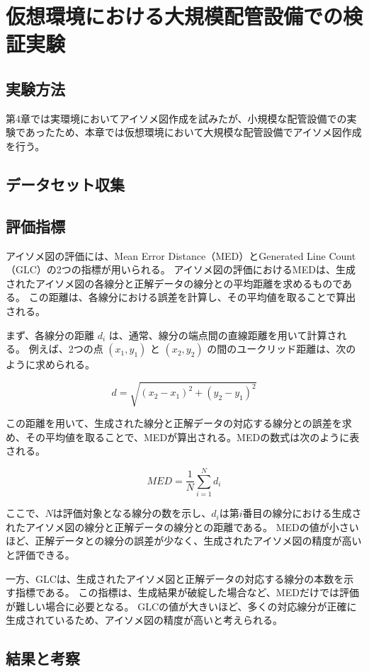 ﻿\chapter{仮想環境における大規模配管設備での検証実験}

\section{実験方法}
第4章では実環境においてアイソメ図作成を試みたが、小規模な配管設備での実験であったため、本章では仮想環境において大規模な配管設備でアイソメ図作成を行う。

\section{データセット収集}

\section{評価指標}
アイソメ図の評価には、Mean Error Distance（MED）とGenerated Line Count（GLC）の2つの指標が用いられる。
アイソメ図の評価におけるMEDは、生成されたアイソメ図の各線分と正解データの線分との平均距離を求めるものである。
この距離は、各線分における誤差を計算し、その平均値を取ることで算出される。

まず、各線分の距離 $d_i$ は、通常、線分の端点間の直線距離を用いて計算される。
例えば、2つの点 $(x_1, y_1)$ と $(x_2, y_2)$ の間のユークリッド距離は、次のように求められる。

\[
d = \sqrt{(x_2 - x_1)^2 + (y_2 - y_1)^2}
\]

この距離を用いて、生成された線分と正解データの対応する線分との誤差を求め、その平均値を取ることで、MEDが算出される。MEDの数式は次のように表される。

\[
MED = \frac{1}{N} \sum_{i=1}^{N} d_i
\]

ここで、$N$は評価対象となる線分の数を示し、$d_i$は第$i$番目の線分における生成されたアイソメ図の線分と正解データの線分との距離である。
MEDの値が小さいほど、正解データとの線分の誤差が少なく、生成されたアイソメ図の精度が高いと評価できる。

一方、GLCは、生成されたアイソメ図と正解データの対応する線分の本数を示す指標である。
この指標は、生成結果が破綻した場合など、MEDだけでは評価が難しい場合に必要となる。
GLCの値が大きいほど、多くの対応線分が正確に生成されているため、アイソメ図の精度が高いと考えられる。

\section{結果と考察}

